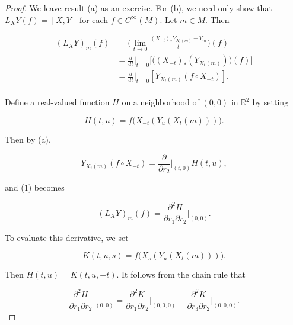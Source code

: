 \begin{proof}
We leave result (a) as an exercise. For (b), we need only show that  $ L_{X}Y(f)=[X,Y] $ for each  $ f\in C^{\infty}(M) $. Let  $ m\in M $. Then

\begin{equation}
\tag{1}\label{eq:2.25:1}
\begin{aligned}{(L_{X}Y)_{m}(f)}&{{}=\bigg(\lim_{t\to0}\frac{(X_{-t})_{*}Y_{X_{t}(m)}-Y_{m}}{t}\bigg)(f)}\\ {}&{{}=\frac{d}{d t}\bigg|_{t=0}\big[\big((X_{-t})_{*}(Y_{X_{t}(m)})\big)(f)\big]}\\ {}&{{}=\frac{d}{d t}\bigg|_{t=0}[Y_{X_{t}(m)}(f\circ X_{-t})].}\\ \end{aligned}
\end{equation}

Define a real-valued function $H$ on a neighborhood of $(0,0)$ in $\mathbb{R}^{2}$ by setting

\begin{equation}
\tag{2}\label{eq:2.25:2}
H(t,u)=f\bigl(X_{-t}(Y_{u}(X_{t}(m)))\bigr).
\end{equation}

Then by (a),

\begin{equation}
\tag{3}\label{eq:2.25:3}
Y_{X_{t}(m)}(f\circ X_{-t})=\frac{\partial}{\partial r_{2}}\bigg\vert_{(t,0)}H(t,u),
\end{equation}

and (1) becomes

\begin{equation}
\tag{4}\label{eq:2.25:4}
(L_{X}Y)_{m}(f)=\frac{\partial^{2}H}{\partial r_{1}\partial r_{2}}\bigg|_{(0,0)}.
\end{equation}

To evaluate this derivative, we set

\begin{equation}
\tag{5}\label{eq:2.25:5}
K(t,u,s)=f\bigl(X_{s}(Y_{u}(X_{t}(m)))\bigr).
\end{equation}

Then  $ H(t,u) = K(t,u,-t) $. It follows from the chain rule that

\begin{equation}
\tag{6}\label{eq:2.25:6}
\frac{\partial^{2}H}{\partial r_{1}\partial r_{2}}\bigg|_{(0,0)}=\frac{\partial^{2}K}{\partial r_{1}\partial r_{2}}\bigg|_{(0,0,0)}-\frac{\partial^{2}K}{\partial r_{3}\partial r_{2}}\bigg|_{(0,0,0)}.
\end{equation}


\end{proof}
